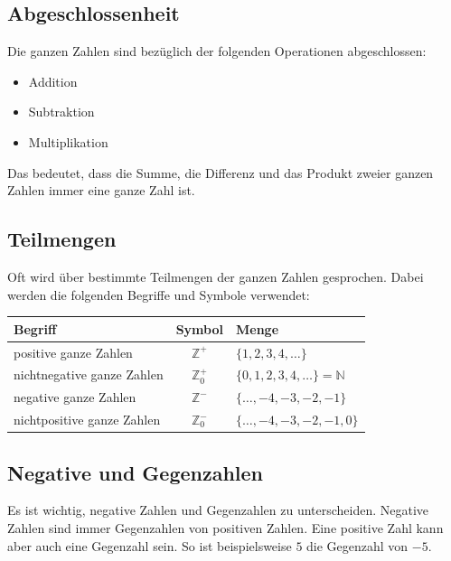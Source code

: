 \subsection{Abgeschlossenheit}

Die ganzen Zahlen sind bezüglich der folgenden Operationen abgeschlossen:
\begin{itemize}[noitemsep]
  \item Addition
  \item Subtraktion
  \item Multiplikation
\end{itemize}
Das bedeutet, dass die Summe, die Differenz und das Produkt zweier ganzen Zahlen immer eine ganze Zahl ist.

\subsection{Teilmengen}
Oft wird über bestimmte Teilmengen der ganzen Zahlen gesprochen. Dabei werden die folgenden Begriffe und Symbole verwendet:
\begin{center}
  \renewcommand{\arraystretch}{1.3}
  \begin{tabularx}{0.8\textwidth}{Xcl}
      \textbf{Begriff}           & \textbf{Symbol}  & \textbf{Menge} \\
    \toprule
      positive ganze Zahlen      & $\mathbb{Z}^{+}$   & $\{1, 2, 3, 4, \ldots\}$ \\
    \midrule
      nichtnegative ganze Zahlen & $\mathbb{Z}_{0}^{+}$ & $\{0, 1, 2, 3, 4, \ldots\} = \mathbb{N}$ \\
    \midrule
      negative ganze Zahlen      & $\mathbb{Z}^{-}$   & $\{\ldots, -4, -3, -2, -1 \}$ \\
    \midrule
      nichtpositive ganze Zahlen & $\mathbb{Z}_{0}^{-}$ & $\{\ldots, -4, -3, -2, -1, 0 \}$ \\
    \bottomrule
  \end{tabularx}
\end{center}

\subsection{Negative und Gegenzahlen}

Es ist wichtig, negative Zahlen und Gegenzahlen zu unterscheiden. Negative Zahlen sind immer Gegenzahlen von positiven Zahlen. Eine positive Zahl kann aber auch eine Gegenzahl sein. So ist beispielsweise $5$ die Gegenzahl von $-5$.

